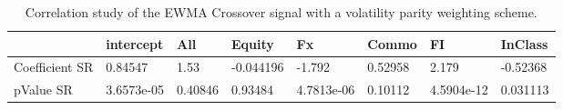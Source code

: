\begin{table}[H]
\centering
\begin{tabular}{llllllll}
& intercept & All & Equity & Fx & Commo & FI & InClass \\ 
\hline 
Coefficient SR & 0.84547 & 1.53 & -0.044196 & -1.792 & 0.52958 & 2.179 & -0.52368 \\ 
pValue SR & 3.6573e-05 & 0.40846 & 0.93484 & 4.7813e-06 & 0.10112 & 4.5904e-12 & 0.031113 \\ 
\hline
\end{tabular}
\caption{Correlation study of the EWMA Crossover signal with a volatility parity weighting scheme.}
\label{MBBS_CORR}
\end{table}